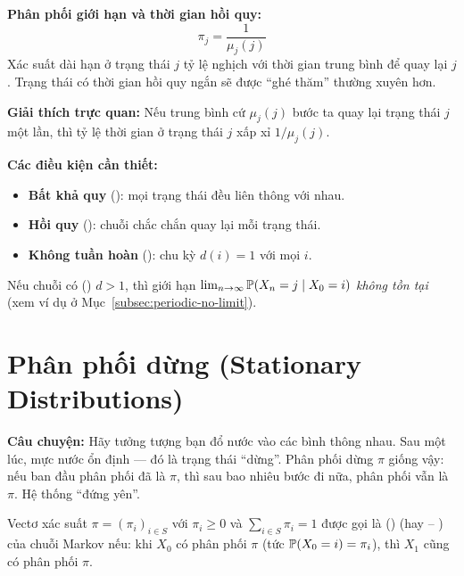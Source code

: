 \begin{congthuc}
\textbf{Phân phối giới hạn và thời gian hồi quy:}
\[
  \boxed{\pi_j = \frac{1}{\mu_j(j)}}
\]
Xác suất dài hạn ở trạng thái $j$ tỷ lệ nghịch với thời gian trung bình để quay lại $j$.
Trạng thái có thời gian hồi quy ngắn sẽ được ``ghé thăm'' thường xuyên hơn.
\end{congthuc}

\textbf{Giải thích trực quan:} Nếu trung bình cứ $\mu_j(j)$ bước ta quay lại trạng thái $j$ một lần,
thì tỷ lệ thời gian ở trạng thái $j$ xấp xỉ $1/\mu_j(j)$.

\textbf{Các điều kiện cần thiết:}
\begin{itemize}[nosep]
  \item \textbf{Bất khả quy} (): mọi trạng thái đều liên thông với nhau.
  \item \textbf{Hồi quy} (): chuỗi chắc chắn quay lại mỗi trạng thái.
  \item \textbf{Không tuần hoàn} (): chu kỳ $d(i) = 1$ với mọi $i$.
\end{itemize}

Nếu chuỗi có  () $d > 1$, thì giới hạn
$\lim_{n\to\infty} \mathbb{P}(X_n = j \mid X_0 = i)$ \emph{không tồn tại} (xem ví dụ ở Mục~\ref{subsec:periodic-no-limit}).

\section{Phân phối dừng (Stationary Distributions)}
\label{sec:stationary-dist}

\textbf{Câu chuyện:} Hãy tưởng tượng bạn đổ nước vào các bình thông nhau.
Sau một lúc, mực nước ổn định --- đó là trạng thái ``dừng''.
Phân phối dừng $\pi$ giống vậy: nếu ban đầu phân phối đã là $\pi$,
thì sau bao nhiêu bước đi nữa, phân phối vẫn là $\pi$. Hệ thống ``đứng yên''.

\begin{dinhnghia}
\label{def:stationary}
Vectơ xác suất $\pi = (\pi_i)_{i\in S}$ với $\pi_i \geq 0$ và $\sum_{i\in S} \pi_i = 1$
được gọi là  () (hay 
-- ) của chuỗi Markov nếu:
khi $X_0$ có phân phối $\pi$ (tức $\mathbb{P}(X_0 = i) = \pi_i$),
thì $X_1$ cũng có phân phối $\pi$.
\end{dinhnghia}

